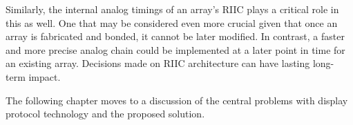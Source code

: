     Similarly, the internal analog timings of an array's RIIC plays a critical role in this as well. One that may be considered even more crucial given that once an array is fabricated and bonded, it cannot be later modified. In contrast, a faster and more precise analog chain could be implemented at a later point in time for an existing array. Decisions made on RIIC architecture can have lasting long-term impact.

    The following chapter moves to a discussion of the central problems with display protocol technology and the proposed solution.
